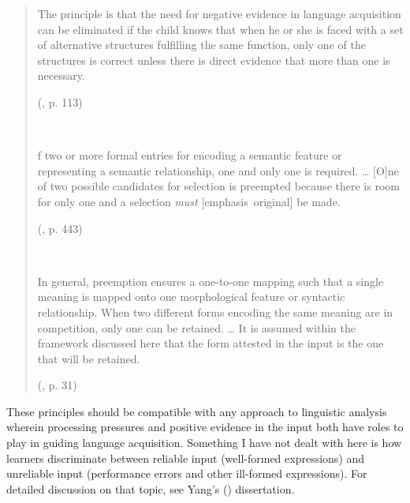 \begin{quote}
\begin{samepage}
The principle is that the need for negative evidence in language acquisition can be eliminated if the child knows that when he or she is faced with a set of alternative structures fulfilling the same function, only one of the structures is correct unless there is direct evidence that more than one is necessary.
\par\nobreak\vspace{5pt}
\hfill (\cite{pinker1984}, p. 113)
\end{samepage}\\\vspace{12pt}

\begin{samepage}
[O]f two or more formal entries for encoding a semantic feature or representing a semantic relationship, one and only one is required. \dots{} [O]ne of two possible candidates for selection is preempted because there is room for only one and a selection \textit{must} [emphasis~original] be made.
\par\nobreak\vspace{5pt}
\hfill (\cite{rutherford1989}, p. 443)
\end{samepage}\\\vspace{12pt}

\begin{samepage}
In general, preemption ensures a one-to-one mapping such that a single meaning is mapped onto one morphological feature or syntactic relationship. When two different forms encoding the same meaning are in competition, only one can be retained. \dots{} It is assumed within the framework discussed here that the form attested in the input is the one that will be retained.
\par\nobreak\vspace{5pt}
\hfill (\cite{trahey1992}, p. 31)
\end{samepage}
\end{quote}\vspace{-12pt}

These principles should be compatible with any approach to linguistic analysis wherein processing pressures and positive evidence in the input both have roles to play in guiding language acquisition. Something I have not dealt with here is how learners discriminate between reliable input (well-formed expressions) and unreliable input (performance errors and other ill-formed expressions). For detailed discussion on that topic, see Yang's (\citeyear{yang2000}) dissertation.

